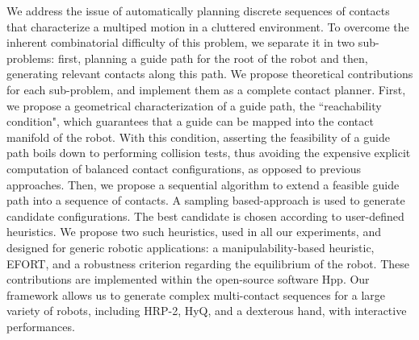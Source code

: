 We address the issue of automatically planning discrete sequences of contacts
that characterize a multiped motion in a cluttered environment.
To overcome the inherent combinatorial difficulty of this problem, we separate it
in two sub-problems: first, planning a guide path for the root of the robot and
then, generating relevant contacts along this path.
We propose theoretical contributions for each sub-problem, and implement them
as a complete contact planner. 
First, we propose a geometrical characterization of a guide path, the ``reachability condition", which guarantees that a
guide can be mapped into the contact manifold of the robot. With this condition, asserting the feasibility
of a guide path boils down to performing collision tests, thus avoiding the expensive explicit computation of balanced contact configurations, as opposed to previous approaches.
Then, we propose a sequential algorithm to extend a feasible guide path into a sequence of contacts.
A sampling based-approach is used to generate candidate configurations.
The best candidate is chosen according to user-defined heuristics. We propose two such heuristics, used in all our experiments, and 
designed for generic robotic applications: a manipulability-based heuristic, EFORT, and a robustness criterion regarding the equilibrium of the robot.
These contributions are implemented within the open-source software Hpp. Our framework allows us to generate complex multi-contact sequences for a large
variety of robots, including HRP-2, HyQ, and a dexterous hand, with interactive performances.
